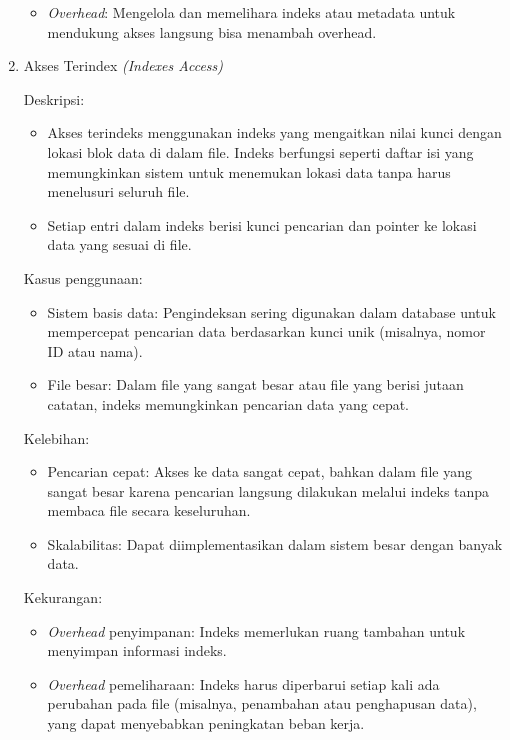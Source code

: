 \documentclass[12pt]{article}
\begin{document}
\begin{enumerate}
\begin{itemize}
        \item \textit{Overhead}: Mengelola dan memelihara indeks atau metadata untuk mendukung akses langsung bisa menambah overhead.

    \end{itemize}



\item  Akses Terindex \textit{(Indexes Access)}

    {Deskripsi:}
    \begin{itemize}
        \item Akses terindeks menggunakan indeks yang mengaitkan nilai kunci dengan lokasi blok data di dalam file. Indeks berfungsi seperti daftar isi yang memungkinkan sistem untuk menemukan lokasi data tanpa harus menelusuri seluruh file.

        \item Setiap entri dalam indeks berisi kunci pencarian dan pointer ke lokasi data yang sesuai di file.
    \end{itemize}

    {Kasus penggunaan:}
     \begin{itemize}
        \item Sistem basis data: Pengindeksan sering digunakan dalam database untuk mempercepat pencarian data berdasarkan kunci unik (misalnya, nomor ID atau nama).

        \item File besar: Dalam file yang sangat besar atau file yang berisi jutaan catatan, indeks memungkinkan pencarian data yang cepat.

    \end{itemize}

    {Kelebihan:}
     \begin{itemize}
        \item Pencarian cepat: Akses ke data sangat cepat, bahkan dalam file yang sangat besar karena pencarian langsung dilakukan melalui indeks tanpa membaca file secara keseluruhan.

        \item Skalabilitas: Dapat diimplementasikan dalam sistem besar dengan banyak data.

    \end{itemize}

    {Kekurangan:}
     \begin{itemize}
        \item \textit{Overhead} penyimpanan: Indeks memerlukan ruang tambahan untuk menyimpan informasi indeks.
        
        \item \textit{Overhead} pemeliharaan: Indeks harus diperbarui setiap kali ada perubahan pada file (misalnya, penambahan atau penghapusan data), yang dapat menyebabkan peningkatan beban kerja.

    \end{itemize}

\end{enumerate}
\end{document}
